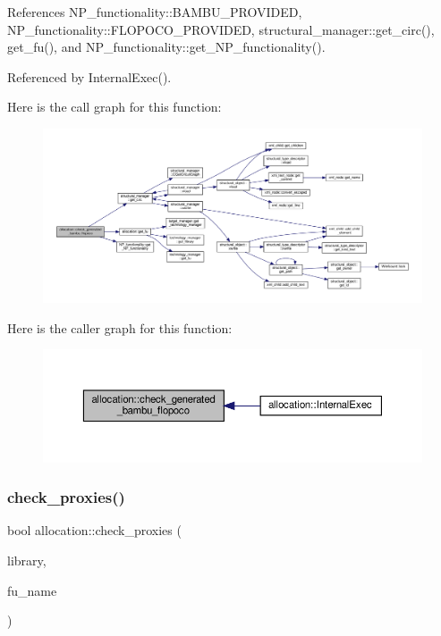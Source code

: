 References N\+P\+\_\+functionality\+::\+B\+A\+M\+B\+U\+\_\+\+P\+R\+O\+V\+I\+D\+ED, N\+P\+\_\+functionality\+::\+F\+L\+O\+P\+O\+C\+O\+\_\+\+P\+R\+O\+V\+I\+D\+ED, structural\+\_\+manager\+::get\+\_\+circ(), get\+\_\+fu(), and N\+P\+\_\+functionality\+::get\+\_\+\+N\+P\+\_\+functionality().



Referenced by Internal\+Exec().

Here is the call graph for this function\+:
\nopagebreak
\begin{figure}[H]
\begin{center}
\leavevmode
\includegraphics[width=350pt]{d0/d74/classallocation_ad0e5db03715e2282b6d3d78507bcf6fb_cgraph}
\end{center}
\end{figure}
Here is the caller graph for this function\+:
\nopagebreak
\begin{figure}[H]
\begin{center}
\leavevmode
\includegraphics[width=350pt]{d0/d74/classallocation_ad0e5db03715e2282b6d3d78507bcf6fb_icgraph}
\end{center}
\end{figure}
\mbox{\label{classallocation_a11a59e23f159e981fdb7d62446153267}} 
\subsubsection{\texorpdfstring{check\+\_\+proxies()}{check\_proxies()}}
{\footnotesize\ttfamily bool allocation\+::check\+\_\+proxies (\begin{DoxyParamCaption}\item[{const \hyperlink{library__manager_8hpp_aacc6d633b0aa80ecfeb1180fd480ae68}{library\+\_\+manager\+Ref}}]{library,  }\item[{std\+::string}]{fu\+\_\+name }\end{DoxyParamCaption})\hspace{0.3cm}{\ttfamily [protected]}}



